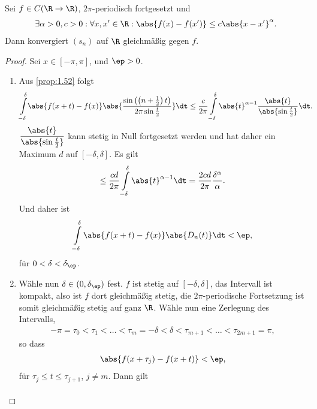 \begin{prop}[Lipschitzkriterium]
\label{prop:1.56}
Sei $f\in C(\R\to\R)$, $2\pi$-periodisch fortgesetzt und
\begin{align*}
\exists \alpha > 0, c > 0 : \forall x,x'\in\R : \abs{f(x)-f(x')} \le
c\abs{x-x'}^\alpha.
\end{align*}
Dann konvergiert $(s_n)$ auf $\R$ gleichmäßig gegen $f$.\fishhere
\end{prop}
\begin{proof}
Sei $x\in[-\pi,\pi]$, und $\ep > 0$.
\begin{enumerate}[label=\arabic{*}.)]
  \item Aus \ref{prop:1.52} folgt
\begin{align*}
\int\limits_{-\delta}^\delta
&\abs{f(x+t)-f(x)}\abs{\frac{\sin\left(\left(n+\frac{1}{2}\right)t
\right)}{2\pi\sin\frac{t}{2}}}\dt\le \frac{c}{2\pi} \int\limits_{-\delta}^\delta
\abs{t}^{\alpha-1} \frac{\abs{t}}{\abs{\sin\frac{t}{2}}} \dt.
\end{align*}
$\dfrac{\abs{t}}{\abs{\sin\frac{t}{2}}}$ kann stetig in Null fortgesetzt werden
und hat daher ein Maximum $d$ auf $[-\delta,\delta]$. Es gilt
\begin{align*}
\le \frac{cd}{2\pi}\int\limits_{-\delta}^\delta \abs{t}^{\alpha-1}\dt =
\frac{2cd}{2\pi}\frac{\delta^\alpha}{\alpha}.
\end{align*}
Und daher ist
\begin{align*}
\int\limits_{-\delta}^\delta \abs{f(x+t)-f(x)}\abs{D_n(t)}\dt < \ep,
\end{align*}
für $0<\delta<\delta_\ep$.
\item Wähle nun $\delta\in(0,\delta_\ep)$ fest. $f$ ist stetig auf
$[-\delta,\delta]$, das Intervall ist kompakt, also ist $f$ dort gleichmäßig
stetig, die $2\pi$-periodische Fortsetzung ist somit gleichmäßig stetig auf
ganz $\R$. Wähle nun eine Zerlegung des Intervalls,
\begin{align*}
-\pi = \tau_0 < \tau_1 < \ldots < \tau_m = -\delta < \delta < \tau_{m+1} <
\ldots < \tau_{2m+1} = \pi,
\end{align*}
so dass
\begin{align*}
\abs{f(x+\tau_j)- f(x+t)} < \ep,
\end{align*}
für $\tau_j \le t \le \tau_{j+1}$, $j\neq m$.
Dann gilt
\begin{align*}

\end{align*}
\end{enumerate}
\end{proof}

